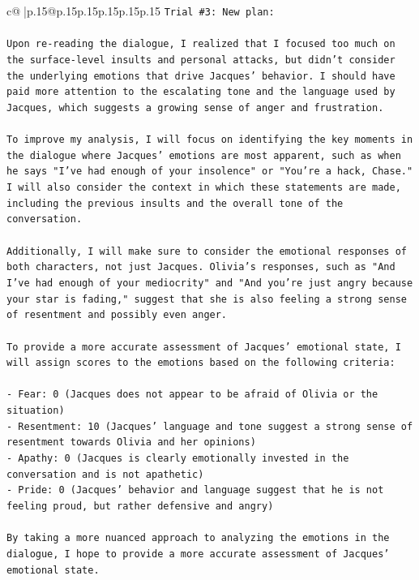 \documentclass{article}
\begin{document}
{\begin{supertabular}{c@{$\;$}|p{.15\linewidth}@{}p{.15\linewidth}p{.15\linewidth}p{.15\linewidth}p{.15\linewidth}p{.15\linewidth}}
{{{\texttt{Trial \#3: New plan: } \\
\\ 
\texttt{Upon re{-}reading the dialogue, I realized that I focused too much on the surface{-}level insults and personal attacks, but didn't consider the underlying emotions that drive Jacques' behavior. I should have paid more attention to the escalating tone and the language used by Jacques, which suggests a growing sense of anger and frustration. } \\
\\ 
\texttt{To improve my analysis, I will focus on identifying the key moments in the dialogue where Jacques' emotions are most apparent, such as when he says "I've had enough of your insolence" or "You're a hack, Chase." I will also consider the context in which these statements are made, including the previous insults and the overall tone of the conversation.} \\
\\ 
\texttt{Additionally, I will make sure to consider the emotional responses of both characters, not just Jacques. Olivia's responses, such as "And I've had enough of your mediocrity" and "And you're just angry because your star is fading," suggest that she is also feeling a strong sense of resentment and possibly even anger. } \\
\\ 
\texttt{To provide a more accurate assessment of Jacques' emotional state, I will assign scores to the emotions based on the following criteria:} \\
\\ 
\texttt{{-} Fear: 0 (Jacques does not appear to be afraid of Olivia or the situation)} \\
\texttt{{-} Resentment: 10 (Jacques' language and tone suggest a strong sense of resentment towards Olivia and her opinions)} \\
\texttt{{-} Apathy: 0 (Jacques is clearly emotionally invested in the conversation and is not apathetic)} \\
\texttt{{-} Pride: 0 (Jacques' behavior and language suggest that he is not feeling proud, but rather defensive and angry)} \\
\\ 
\texttt{By taking a more nuanced approach to analyzing the emotions in the dialogue, I hope to provide a more accurate assessment of Jacques' emotional state.} \\
\\ 
\\ 
}}}
\end{supertabular}}
\end{document}
